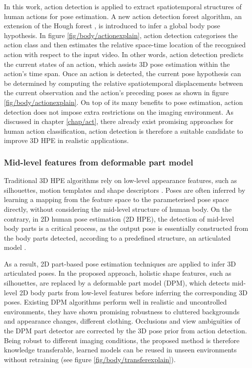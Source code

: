 In this work, action detection is applied to extract spatiotemporal structures of human actions for pose estimation. A new action detection forest algorithm, an extension of the Hough forest \cite{Gall2009}, is introduced to infer a global body pose hypothesis.   
In figure \ref{fig/body/actionexplain}, action detection categorises the action class and then estimates the relative space-time location of the recognised action with respect to the input video. In other words, action detection predicts the current states of an action, which assists 3D pose estimation within the action's time span. Once an action is detected, the current pose hypothesis can be determined by computing the relative spatiotemporal displacements between the current observation and the action's preceding poses as shown in figure \ref{fig/body/actionexplain}.   
On top of its many benefits to pose estimation, action detection does not impose extra restrictions on the imaging environment. As discussed in chapter \ref{chap/act}, there already exist promising approaches for human action classification, action detection is therefore a suitable candidate to improve 3D HPE in realistic applications.   

\subsubsection{Mid-level features from deformable part model} 

Traditional 3D HPE algorithms rely on low-level appearance features, such as silhouettes, motion templates and shape descriptors \cite{Hogg1983, Rogez2012, Navaratnam2006, Pons-Moll2011, Sigal2012}. Poses are often inferred by learning a mapping from the feature space to the parameterised pose space directly, without considering the mid-level structure of human body.  
On the contrary, in 2D human pose estimation (2D HPE), the detection of mid-level body parts is a critical process, as the output pose is essentially constructed from the body parts detected, according to a predefined structure, \eg an articulated model \cite{Felzenszwalb2000, Andriluka2009, Yang2011, Eichner2012}.

As a result, 2D part-based pose estimation techniques are applied to infer 3D articulated poses. In the proposed approach, holistic shape features, such as silhouettes, are replaced by a deformable part model (DPM), which detects mid-level 2D body parts from low-level features before inferring the corresponding 3D poses. Existing DPM algorithms perform well in realistic and uncontrolled environments, they have shown promising robustness to cluttered backgrounds and appearance changes, \eg different clothing. 
Occlusions and view ambiguities of the DPM part detector are corrected by the 3D pose prior from action detection. 
Being robust to different imaging conditions, the proposed method is therefore knowledge transferable, learned models can be reused in unseen environments without retraining (see figure \ref{fig/body/transferexplain}). 


